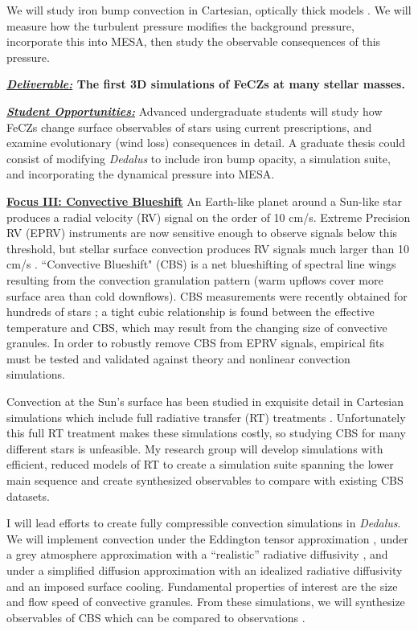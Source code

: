 \documentclass[12pt]{article}
\newcommand{\sct}[1]{\vspace{0.3cm}\hspace{-\parindent}\textbf{\underline{#1}}\hspace{0.3cm}}
\begin{document}
We will study iron bump convection in Cartesian, optically thick models \citep[good approximations,][]{jermyn_etal_2022_atlas}.
We will measure how the turbulent pressure modifies the background pressure, incorporate this into MESA, then study the observable consequences of this pressure.

\textbf{\underline{\emph{Deliverable:}} The first 3D simulations of FeCZs at many stellar masses.}

\textbf{\underline{\emph{Student Opportunities:}}} Advanced undergraduate students will study how FeCZs change surface observables of stars using current prescriptions, and examine evolutionary (wind loss) consequences in detail.
A graduate thesis could consist of modifying \emph{Dedalus} to include iron bump opacity, a simulation suite, and incorporating the dynamical pressure into MESA.

\sct{Focus III: Convective Blueshift}
An Earth-like planet around a Sun-like star produces a radial velocity (RV) signal on the order of 10 cm/s.
Extreme Precision RV (EPRV) instruments are now sensitive enough to observe signals below this threshold, but stellar surface convection produces RV signals much larger than 10 cm/s \citep{crass_etal_2021}.
``Convective Blueshift" (CBS) is a net blueshifting of spectral line wings resulting from the convection granulation pattern (warm upflows cover more surface area than cold downflows).
CBS measurements were recently obtained for hundreds of stars \citep{liebing_etal_2021}; a tight cubic relationship is found between the effective temperature and CBS, which may result from the changing size of convective granules. %
In order to robustly remove CBS from EPRV signals, empirical fits must be tested and validated against theory and nonlinear convection simulations. 

Convection at the Sun's surface has been studied in exquisite detail in Cartesian simulations which include full radiative transfer (RT) treatments \citep[e.g.,][]{rempel2020, danilovic_etal_2022}.
Unfortunately this full RT treatment makes these simulations costly, so studying CBS for many different stars is unfeasible.
My research group will develop simulations with efficient, reduced models of RT to create a simulation suite spanning the lower main sequence and create synthesized observables to compare with existing CBS datasets.

I will lead efforts to create fully compressible convection simulations in \emph{Dedalus}.
We will implement convection under the Eddington tensor approximation \citep[e.g., ref.][sct.~XI.G]{burns_etal_2020}, under a grey atmosphere approximation with a ``realistic'' radiative diffusivity \citep{barekat_brandenburg_2014}, and under a simplified diffusion approximation with an idealized radiative diffusivity and an imposed surface cooling.
Fundamental properties of interest are the size and flow speed of convective granules.
From these simulations, we will synthesize observables of CBS which can be compared to observations \citep{liebing_etal_2021}.
\end{document}
